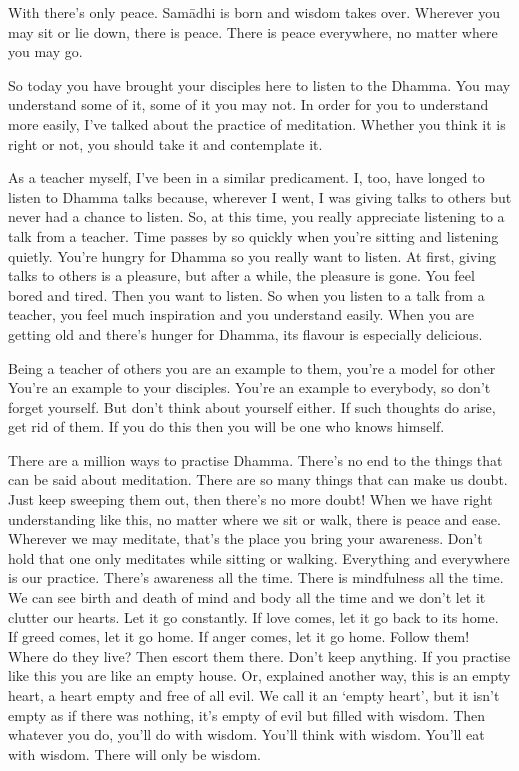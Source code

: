 With  there's only peace. Sam\=adhi is born and wisdom takes over. Wherever you may sit or lie down, there is peace. There is peace everywhere, no matter where you may go.

So today you have brought your disciples here to listen to the Dhamma. You may understand some of it, some of it you may not. In order for you to understand more easily, I've talked about the practice of meditation. Whether you think it is right or not, you should take it and contemplate it.

As a teacher myself, I've been in a similar predicament. I, too, have longed to listen to Dhamma talks because, wherever I went, I was giving talks to others but never had a chance to listen. So, at this time, you really appreciate listening to a talk from a teacher. Time passes by so quickly when you're sitting and listening quietly. You're hungry for Dhamma so you really want to listen. At first, giving talks to others is a pleasure, but after a while, the pleasure is gone. You feel bored and tired. Then you want to listen. So when you listen to a talk from a teacher, you feel much inspiration and you understand easily. When you are getting old and there's hunger for Dhamma, its flavour is especially delicious.

Being a teacher of others you are an example to them, you're a model for other  You're an example to your disciples. You're an example to everybody, so don't forget yourself. But don't think about yourself either. If such thoughts do arise, get rid of them. If you do this then you will be one who knows himself.

There are a million ways to practise Dhamma. There's no end to the things that can be said about meditation. There are so many things that can make us doubt. Just keep sweeping them out, then there's no more doubt! When we have right understanding like this, no matter where we sit or walk, there is peace and ease. Wherever we may meditate, that's the place you bring your awareness. Don't hold that one only meditates while sitting or walking. Everything and everywhere is our practice. There's awareness all the time. There is mindfulness all the time. We can see birth and death of mind and body all the time and we don't let it clutter our hearts. Let it go constantly. If love comes, let it go back to its home. If greed comes, let it go home. If anger comes, let it go home. Follow them! Where do they live? Then escort them there. Don't keep anything. If you practise like this you are like an empty house. Or, explained another way, this is an empty heart, a heart empty and free of all evil. We call it an `empty heart', but it isn't empty as if there was nothing, it's empty of evil but filled with wisdom. Then whatever you do, you'll do with wisdom. You'll think with wisdom. You'll eat with wisdom. There will only be wisdom.

